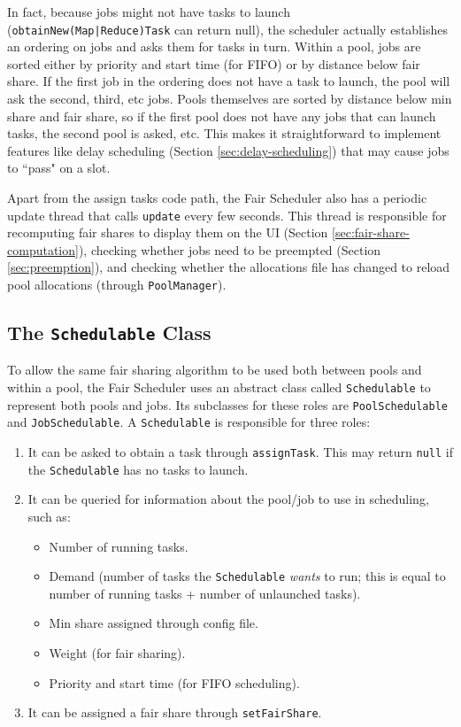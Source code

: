\documentclass[11pt]{article}
\begin{document}
In fact, because jobs might not have tasks to launch ({\tt obtainNew(Map|Reduce)Task} can return null), the scheduler actually establishes an ordering on jobs and asks them for tasks in turn. Within a pool, jobs are sorted either by priority and start time (for FIFO) or by distance below fair share. If the first job in the ordering does not have a task to launch, the pool will ask the second, third, etc jobs. Pools themselves are sorted by distance below min share and fair share, so if the first pool does not have any jobs that can launch tasks, the second pool is asked, etc. This makes it straightforward to implement features like delay scheduling (Section \ref{sec:delay-scheduling}) that may cause jobs to ``pass" on a slot.

Apart from the assign tasks code path, the Fair Scheduler also has a periodic update thread that calls {\tt update} every few seconds. This thread is responsible for recomputing fair shares to display them on the UI (Section \ref{sec:fair-share-computation}), checking whether jobs need to be preempted (Section \ref{sec:preemption}), and checking whether the allocations file has changed to reload pool allocations (through {\tt PoolManager}).

\subsection{The {\tt Schedulable} Class}

To allow the same fair sharing algorithm to be used both between pools and within a pool, the Fair Scheduler uses an abstract class called {\tt Schedulable} to represent both pools and jobs. Its subclasses for these roles are {\tt PoolSchedulable} and {\tt JobSchedulable}. A {\tt Schedulable} is responsible for three roles:
\begin{enumerate}
  \item It can be asked to obtain a task through {\tt assignTask}. This may return {\tt null} if the {\tt Schedulable} has no tasks to launch.
  \item It can be queried for information about the pool/job to use in scheduling, such as:
  \begin{itemize}
    \item Number of running tasks.
    \item Demand (number of tasks the {\tt Schedulable} \emph{wants} to run; this is equal to number of running tasks + number of unlaunched tasks).
    \item Min share assigned through config file.
    \item Weight (for fair sharing).
    \item Priority and start time (for FIFO scheduling).
  \end{itemize}
  \item It can be assigned a fair share through {\tt setFairShare}.
\end{enumerate}
\end{document}
